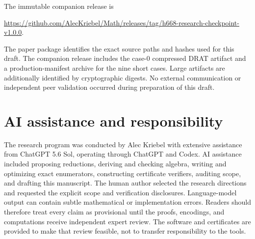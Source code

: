 \documentclass[11pt]{article}
\theoremstyle{remark}
\begin{document}
The immutable companion release is
\begin{center}
\url{https://github.com/AlecKriebel/Math/releases/tag/h668-research-checkpoint-v1.0.0}.
\end{center}
The paper package identifies the exact source paths and hashes used for
this draft.  The companion release includes the case-$0$ compressed DRAT
artifact and a production-manifest archive for the nine short cases.
Large artifacts are additionally identified by cryptographic digests.
No external communication or independent peer validation occurred during
preparation of this draft.

\section*{AI assistance and responsibility}

The research program was conducted by Alec Kriebel with extensive
assistance from ChatGPT 5.6 Sol, operating through ChatGPT and Codex.
AI assistance included proposing
reductions, deriving and checking algebra, writing and optimizing exact
enumerators, constructing certificate verifiers, auditing scope, and
drafting this manuscript.  The human author selected the research
directions and requested the explicit scope and verification disclosures.
Language-model output can contain subtle mathematical or implementation
errors.  Readers should therefore treat every claim as provisional until
the proofs, encodings, and computations receive independent expert review.
The software and certificates are provided to make that review feasible,
not to transfer responsibility to the tools.
\end{document}
